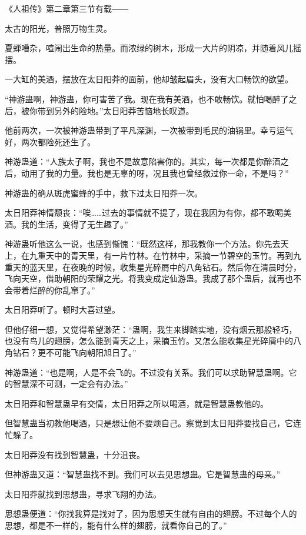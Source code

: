 
\begin{this_body}

《人祖传》第二章第三节有载――

太古的阳光，普照万物生灵。

夏蝉嘈杂，喧闹出生命的热量。而浓绿的树木，形成一大片的阴凉，并随着风儿摇摆。

一大缸的美酒，摆放在太日阳莽的面前，他却皱起眉头，没有大口畅饮的欲望。

“神游蛊啊，神游蛊，你可害苦了我。现在我有美酒，也不敢畅饮。就怕喝醉了之后，被你带到另外的险地。”太日阳莽苦恼地长叹道。

他前两次，一次被神游蛊带到了平凡深渊，一次被带到毛民的油锅里。幸亏运气好，两次都险死还生了。

神游蛊道：“人族太子啊，我也不是故意陷害你的。其实，每一次都是你醉酒之后，动用了我的力量。我也是无辜的呀，况且我也曾经救过你一命，不是吗？”

神游蛊的确从斑虎蜜蜂的手中，救下过太日阳莽一次。

太日阳莽神情颓丧：“唉……过去的事情就不提了，现在我因为有你，都不敢喝美酒。我的生活，变得了无生趣了。”

神游蛊听他这么一说，也感到惭愧：“既然这样，那我教你一个方法。你先去天上，在九重天中的青天里，有一片竹林。在竹林中，采摘一节碧空的玉竹。再到九重天的蓝天里，在夜晚的时候，收集星光碎屑中的八角钻石。然后你在清晨时分，飞向天空，借助朝阳的荣耀之光。将我变成定仙游蛊。我成了那个蛊后，就再也不会带着烂醉的你乱窜了。”

太日阳莽听了。顿时大喜过望。

但他仔细一想，又觉得希望渺茫：“蛊啊，我生来脚踏实地，没有烟云那般轻巧，也没有鸟儿的翅膀，怎么能到青天之上，采摘玉竹。又怎么能收集星光碎屑中的八角钻石？更不可能飞向朝阳旭日了。”

神游蛊道：“也是啊，人是不会飞的。不过没有关系。我们可以求助智慧蛊啊。它的智慧深不可测，一定会有办法。”

太日阳莽和智慧蛊早有交情，太日阳莽之所以喝酒，就是智慧蛊教他的。

但智慧蛊当初教他喝酒，只是想让他不要烦自己。察觉到太日阳莽要找自己，它连忙躲了。

太日阳莽没有找到智慧蛊，十分沮丧。

但神游蛊又道：“智慧蛊找不到。我们可以去见思想蛊。它是智慧蛊的母亲。”

太日阳莽就找到思想蛊，寻求飞翔的办法。

思想蛊便道：“你找我算是找对了，因为思想天生就有自由的翅膀。不过每个人的思想，都是不一样的，能有什么样的翅膀，就看你自己的了。”


\end{this_body}
